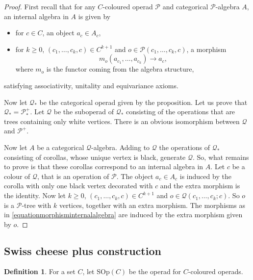 \documentclass[]{amsart}
\theoremstyle{definition}
\newtheorem{definition}[theorem]{Definition}
\begin{document}
\begin{proof}
	First recall \cite[Definition 9.1]{batanin} that for any $C$-coloured operad $\mathcal{P}$ and categorical $\mathcal{P}$-algebra $A$, an internal algebra in $A$ is given by
	\begin{itemize}
		\item for $c \in C$, an object $a_c \in A_c$,
		
		\item for $k \geq 0$, $(c_1,\ldots,c_k,c) \in C^{k+1}$ and $o \in \mathcal{P}(c_1,\ldots,c_k,c)$, a morphism
		\begin{equation}\label{equationmorphisminternalalgebra}
			m_o(a_{c_1},\ldots,a_{c_k}) \to a_c,
		\end{equation}
		where $m_o$ is the functor coming from the algebra structure,
	\end{itemize}
	satisfying associativity, unitality and equivariance axioms.

	Now let $\mathcal{Q}_*$ be the categorical operad given by the proposition. Let us prove that $\mathcal{Q}_*=\mathcal{P}_*^+$. Let $\mathcal{Q}$ be the suboperad of $\mathcal{Q}_*$ consisting of the operations that are trees containing only white vertices. There is an obvious isomorphism between $\mathcal{Q}$ and $\mathcal{P}^+$.
	
	Now let $A$ be a categorical $\mathcal{Q}$-algebra. Adding to $\mathcal{Q}$ the operations of $\mathcal{Q}_*$ consisting of corollas, whose unique vertex is black, generate $\mathcal{Q}$. So, what remains to prove is that these corollas correspond to an internal algebra in $A$. Let $c$ be a colour of $\mathcal{Q}$, that is an operation of $\mathcal{P}$. The object $a_c \in A_c$ is induced by the corolla with only one black vertex decorated with $c$ and the extra morphism is the identity. Now let $k \geq 0$, $(c_1,\ldots,c_k,c) \in C^{k+1}$ and $o \in \mathcal{Q}(c_1,\ldots,c_k;c)$. So $o$ is a $\mathcal{P}$-tree with $k$ vertices, together with an extra morphism. The morphisms as in \eqref{equationmorphisminternalalgebra} are induced by the extra morphism given by $o$.
\end{proof}


\subsection{Swiss cheese plus construction}


\begin{definition}
	For a set $C$, let $\mathrm{SOp}(C)$ be the operad for $C$-coloured operads.
\end{definition}
\end{document}
